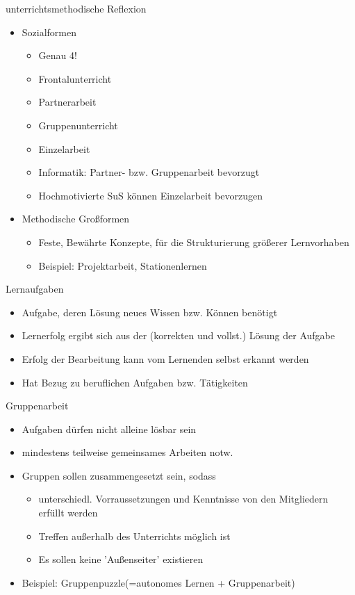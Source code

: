 \documentclass{article}
\begin{document}
\begin{block}{unterrichtsmethodische Reflexion}
\begin{itemize}
        \item Sozialformen
        \begin{itemize}
            \item Genau 4!
            \item Frontalunterricht
            \item Partnerarbeit
            \item Gruppenunterricht
            \item Einzelarbeit
            \item Informatik: Partner- bzw. Gruppenarbeit bevorzugt
            \item Hochmotivierte SuS können Einzelarbeit bevorzugen
        \end{itemize}
        \item Methodische Großformen
        \begin{itemize}
            \item Feste, Bewährte Konzepte, für die Strukturierung größerer Lernvorhaben
            \item Beispiel: Projektarbeit, Stationenlernen
        \end{itemize}
    \end{itemize}
\end{block}

\begin{block}{Lernaufgaben}
    \begin{itemize}
        \item Aufgabe, deren Lösung neues Wissen bzw. Können benötigt
        \item Lernerfolg ergibt sich aus der (korrekten und vollst.) Lösung der Aufgabe
        \item Erfolg der Bearbeitung kann vom Lernenden selbst erkannt werden
        \item Hat Bezug zu beruflichen Aufgaben bzw. Tätigkeiten
    \end{itemize}
\end{block}

\begin{block}{Gruppenarbeit}
    \begin{itemize}
        \item Aufgaben dürfen nicht alleine lösbar sein
        \item mindestens teilweise gemeinsames Arbeiten notw.
        \item Gruppen sollen zusammengesetzt sein, sodass
        \begin{itemize}
            \item unterschiedl. Vorraussetzungen und Kenntnisse von den Mitgliedern erfüllt werden
            \item Treffen außerhalb des Unterrichts möglich ist
            \item Es sollen keine 'Außenseiter' existieren
        \end{itemize}
        \item Beispiel: Gruppenpuzzle(=autonomes Lernen + Gruppenarbeit)
    \end{itemize}
\end{block}
\end{document}
